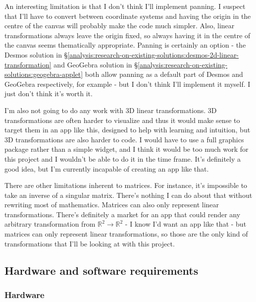 \documentclass[../main.tex]{subfiles}
\begin{document}
An interesting limitation is that I don't think I'll implement panning. I suspect that I'll have to convert between coordinate systems and having the origin in the centre of the canvas will probably make the code much simpler. Also, linear transformations always leave the origin fixed, so always having it in the centre of the canvas seems thematically appropriate. Panning is certainly an option - the Desmos solution in \S\ref{analysis:research-on-existing-solutions:desmos-2d-linear-transformation} and GeoGebra solution in \S\ref{analysis:research-on-existing-solutions:geogebra-applet} both allow panning as a default part of Desmos and GeoGebra respectively, for example - but I don't think I'll implement it myself. I just don't think it's worth it.

I'm also not going to do any work with 3D linear transformations. 3D transformations are often harder to visualize and thus it would make sense to target them in an app like this, designed to help with learning and intuition, but 3D transformations are also harder to code. I would have to use a full graphics package rather than a simple widget, and I think it would be too much work for this project and I wouldn't be able to do it in the time frame. It's definitely a good idea, but I'm currently incapable of creating an app like that.

There are other limitations inherent to matrices. For instance, it's impossible to take an inverse of a singular matrix. There's nothing I can do about that without rewriting most of mathematics. Matrices can also only represent linear transformations. There's definitely a market for an app that could render any arbitrary transformation from $\mathbb{R}^2 \to \mathbb{R}^2$ - I know I'd want an app like that - but matrices can only represent linear transformations, so those are the only kind of transformations that I'll be looking at with this project.

\subsection{Hardware and software requirements\label{analysis:hardware-and-software-requirements}}

\subsubsection{Hardware\label{analysis:hardware-and-software-requirements:hardware}}

\end{document}
